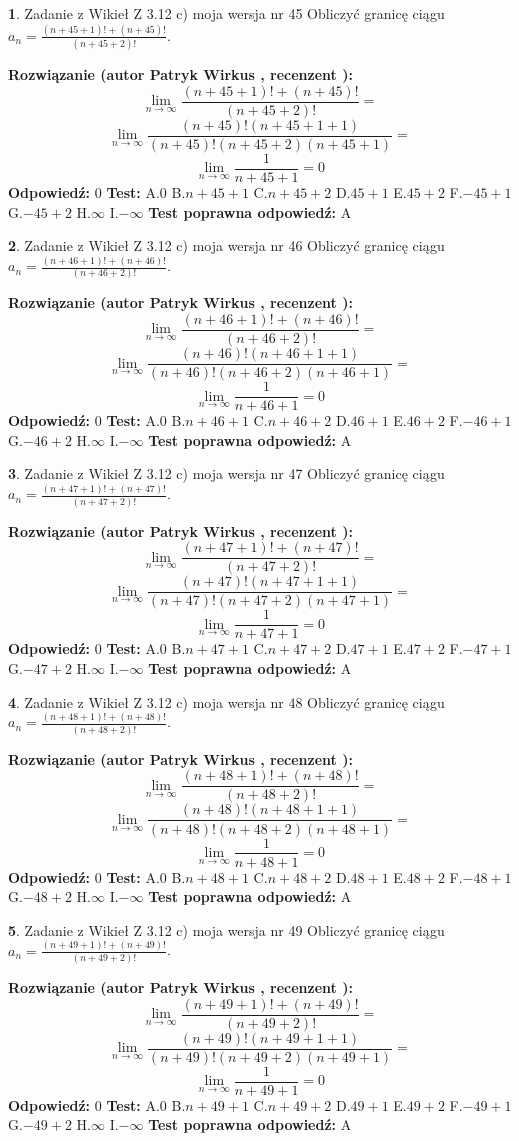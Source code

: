 \documentclass[12pt, a4paper]{article}
\theoremstyle{definition} %
\newtheorem{zad}{}
\newcommand{\zadStart}[1]{\begin{zad}#1\newline}
\newcommand{\zadStop}{\end{zad}}
\newcommand{\rozwStart}[2]{\noindent \textbf{Rozwiązanie (autor #1 , recenzent #2): }\newline}
\newcommand{\rozwStop}{\newline}
\newcommand{\odpStart}{\noindent \textbf{Odpowiedź:}\newline}
\newcommand{\odpStop}{\newline}
\newcommand{\testStart}{\noindent \textbf{Test:}\newline}
\newcommand{\testStop}{\newline}
\newcommand{\kluczStart}{\noindent \textbf{Test poprawna odpowiedź:}\newline}
\newcommand{\kluczStop}{\newline}
\begin{document}
\zadStart{Zadanie z Wikieł Z 3.12 c) moja wersja nr 45}
Obliczyć granicę ciągu $a_{n}=\frac{(n+45+1)!+(n+45)!}{(n+45+2)!}$.
\zadStop
\rozwStart{Patryk Wirkus}{}
$$\lim\limits_{n\to\infty}\frac{(n+45+1)!+(n+45)!}{(n+45+2)!}=$$
$$\lim\limits_{n\to\infty}\frac{(n+45)!(n+45+1+1)}{(n+45)!(n+45+2)(n+45+1)}=$$
$$\lim\limits_{n\to\infty}\frac{1}{n+45+1}= 0$$
\rozwStop
\odpStart
$0$
\odpStop
\testStart
A.$0$
B.$n+45+1$
C.$n+45+2$
D.$45+1$
E.$45+2$
F.$-45+1$
G.$-45+2$
H.$\infty$
I.$-\infty$
\testStop
\kluczStart
A
\kluczStop



\zadStart{Zadanie z Wikieł Z 3.12 c) moja wersja nr 46}
Obliczyć granicę ciągu $a_{n}=\frac{(n+46+1)!+(n+46)!}{(n+46+2)!}$.
\zadStop
\rozwStart{Patryk Wirkus}{}
$$\lim\limits_{n\to\infty}\frac{(n+46+1)!+(n+46)!}{(n+46+2)!}=$$
$$\lim\limits_{n\to\infty}\frac{(n+46)!(n+46+1+1)}{(n+46)!(n+46+2)(n+46+1)}=$$
$$\lim\limits_{n\to\infty}\frac{1}{n+46+1}= 0$$
\rozwStop
\odpStart
$0$
\odpStop
\testStart
A.$0$
B.$n+46+1$
C.$n+46+2$
D.$46+1$
E.$46+2$
F.$-46+1$
G.$-46+2$
H.$\infty$
I.$-\infty$
\testStop
\kluczStart
A
\kluczStop



\zadStart{Zadanie z Wikieł Z 3.12 c) moja wersja nr 47}
Obliczyć granicę ciągu $a_{n}=\frac{(n+47+1)!+(n+47)!}{(n+47+2)!}$.
\zadStop
\rozwStart{Patryk Wirkus}{}
$$\lim\limits_{n\to\infty}\frac{(n+47+1)!+(n+47)!}{(n+47+2)!}=$$
$$\lim\limits_{n\to\infty}\frac{(n+47)!(n+47+1+1)}{(n+47)!(n+47+2)(n+47+1)}=$$
$$\lim\limits_{n\to\infty}\frac{1}{n+47+1}= 0$$
\rozwStop
\odpStart
$0$
\odpStop
\testStart
A.$0$
B.$n+47+1$
C.$n+47+2$
D.$47+1$
E.$47+2$
F.$-47+1$
G.$-47+2$
H.$\infty$
I.$-\infty$
\testStop
\kluczStart
A
\kluczStop



\zadStart{Zadanie z Wikieł Z 3.12 c) moja wersja nr 48}
Obliczyć granicę ciągu $a_{n}=\frac{(n+48+1)!+(n+48)!}{(n+48+2)!}$.
\zadStop
\rozwStart{Patryk Wirkus}{}
$$\lim\limits_{n\to\infty}\frac{(n+48+1)!+(n+48)!}{(n+48+2)!}=$$
$$\lim\limits_{n\to\infty}\frac{(n+48)!(n+48+1+1)}{(n+48)!(n+48+2)(n+48+1)}=$$
$$\lim\limits_{n\to\infty}\frac{1}{n+48+1}= 0$$
\rozwStop
\odpStart
$0$
\odpStop
\testStart
A.$0$
B.$n+48+1$
C.$n+48+2$
D.$48+1$
E.$48+2$
F.$-48+1$
G.$-48+2$
H.$\infty$
I.$-\infty$
\testStop
\kluczStart
A
\kluczStop



\zadStart{Zadanie z Wikieł Z 3.12 c) moja wersja nr 49}
Obliczyć granicę ciągu $a_{n}=\frac{(n+49+1)!+(n+49)!}{(n+49+2)!}$.
\zadStop
\rozwStart{Patryk Wirkus}{}
$$\lim\limits_{n\to\infty}\frac{(n+49+1)!+(n+49)!}{(n+49+2)!}=$$
$$\lim\limits_{n\to\infty}\frac{(n+49)!(n+49+1+1)}{(n+49)!(n+49+2)(n+49+1)}=$$
$$\lim\limits_{n\to\infty}\frac{1}{n+49+1}= 0$$
\rozwStop
\odpStart
$0$
\odpStop
\testStart
A.$0$
B.$n+49+1$
C.$n+49+2$
D.$49+1$
E.$49+2$
F.$-49+1$
G.$-49+2$
H.$\infty$
I.$-\infty$
\testStop
\kluczStart
A
\kluczStop
\end{document}

